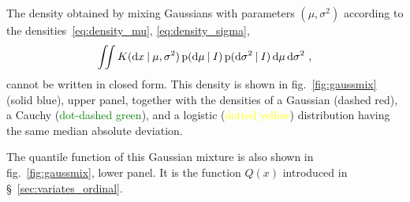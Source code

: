 \documentclass[\ifafour a4paper,12pt,\else a5paper,10pt,\fi%
onecolumn,oneside,article,%
british%
]{memoir}
\theoremstyle{remark}
\theoremstyle{innote}
\newcommand*{\di}{\mathrm{d}}%
\newcommand*{\p}{\mathrm{p}}%
\renewcommand*{\|}[1][]{\nonscript\:#1\vert\nonscript\:\mathopen{}}
\newcommand*{\sect}{\S}%
\newcommand*{\fig}{fig.}%
\begin{document}
\medskip

The density obtained by mixing Gaussians with parameters $(\mu, \sigma^{2})$ according to the densities~\eqref{eq:density_mu}, \eqref{eq:density_sigma},
\begin{equation}
  \label{eq:gaussian_mixture}
  \iint K(\di x \| \mu, \sigma^{2})\, \p(\di\mu \|I)\, \p(\di\sigma^{2} \|I)\,\di\mu\,\di\sigma^{2} \ ,
\end{equation}
cannot be written in closed form. This density is shown in \fig~\ref{fig:gaussmix} (\textcolor{bluepurple}{solid blue}), upper panel, together with the densities of a Gaussian (\textcolor{redpurple}{dashed red}), a Cauchy (\textcolor{green}{dot-dashed green}), and a logistic (\textcolor{yellow}{dotted yellow}) distribution having the same median absolute deviation.

The quantile function of this Gaussian mixture is also shown in \fig~\ref{fig:gaussmix}, lower panel. It is the function $Q(x)$ introduced in \sect~\ref{sec:variates_ordinal}.
\end{document}

